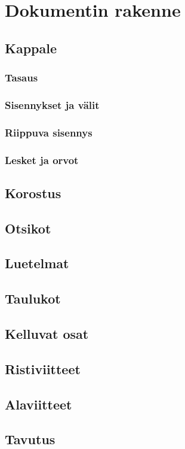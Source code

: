 \chapter{Dokumentin rakenne}
\section{Kappale}
\label{luku:kappale}

\subsection{Tasaus}
\subsection{Sisennykset ja välit}
\subsection{Riippuva sisennys}
\subsection{Lesket ja orvot}
\section{Korostus}
\section{Otsikot}
\section{Luetelmat}
\section{Taulukot}
\label{luku:taulukot}
\section{Kelluvat osat}
\section{Ristiviitteet}
\section{Alaviitteet}
\section{Tavutus}
\label{luku:tavutus}

